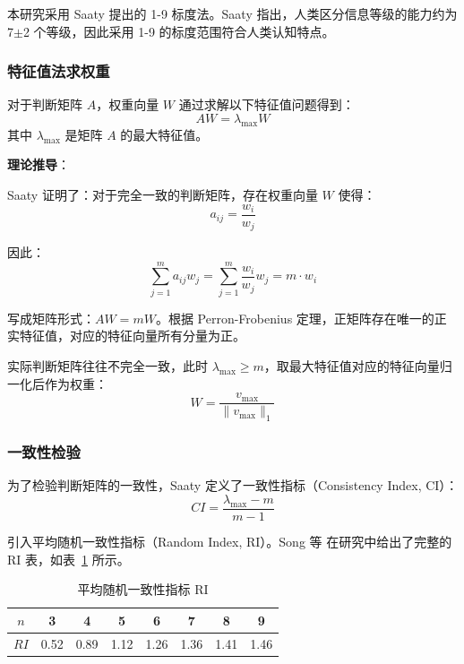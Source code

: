 本研究采用 Saaty\cite{saaty2007analytic} 提出的 1-9 标度法。Saaty 指出，人类区分信息等级的能力约为 7$\pm$2 个等级，因此采用 1-9 的标度范围符合人类认知特点。

\subsubsection{特征值法求权重}

对于判断矩阵 $A$，权重向量 $W$ 通过求解以下特征值问题得到\cite{saaty2007analytic}：
\begin{equation}
    AW = \lambda_{\max} W
    \label{eq:eigen}
\end{equation}
其中 $\lambda_{\max}$ 是矩阵 $A$ 的最大特征值。

\textbf{理论推导}：

Saaty\cite{saaty2007analytic} 证明了：对于完全一致的判断矩阵，存在权重向量 $W$ 使得：
\begin{equation}
    a_{ij} = \frac{w_i}{w_j}
    \label{eq:consistent}
\end{equation}

因此：
\begin{equation}
    \sum_{j=1}^{m} a_{ij} w_j = \sum_{j=1}^{m} \frac{w_i}{w_j} w_j = m \cdot w_i
\end{equation}

写成矩阵形式：$AW = mW$。根据 Perron-Frobenius 定理，正矩阵存在唯一的正实特征值，对应的特征向量所有分量为正。

实际判断矩阵往往不完全一致，此时 $\lambda_{\max} \geq m$\cite{saaty2007analytic}，取最大特征值对应的特征向量归一化后作为权重：
\begin{equation}
    W = \frac{v_{\max}}{\|v_{\max}\|_1}
    \label{eq:weight_norm}
\end{equation}

\subsubsection{一致性检验}

为了检验判断矩阵的一致性，Saaty\cite{saaty2007analytic} 定义了一致性指标（Consistency Index, CI）：
\begin{equation}
    CI = \frac{\lambda_{\max} - m}{m - 1}
    \label{eq:ci}
\end{equation}

引入平均随机一致性指标（Random Index, RI）。Song 等\cite{song2025quantifying} 在研究中给出了完整的 RI 表，如表~\ref{tab:ri} 所示。

\begin{table}[htbp]
    \centering
    \caption{平均随机一致性指标 RI\cite{song2025quantifying}}
    \label{tab:ri}
    \begin{tabular}{cccccccc}
        \toprule
        $n$ & 3 & 4 & 5 & 6 & 7 & 8 & 9 \\
        \midrule
        $RI$ & 0.52 & 0.89 & 1.12 & 1.26 & 1.36 & 1.41 & 1.46 \\
        \bottomrule
    \end{tabular}
\end{table}

